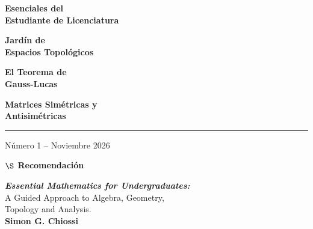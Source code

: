 \documentclass[8pt]{extarticle}
\begin{document}
\begin{center}
\begin{center}

\end{center}


\vspace{0.4cm}

\noindent
    {\selectfont\footnotesize\bfseries
\parbox[c]{1.7cm}{\centering\textbf{Esenciales del \\ Estudiante de Licenciatura}}%
\hfill
\parbox[c]{1.7cm}{\centering\textbf{Jardín de \\Espacios Topológicos}}%
\hfill
\parbox[c]{1.7cm}{\centering\textbf{El Teorema de \\Gauss-Lucas}}%
\hfill
\parbox[c]{1.7cm}{\centering\textbf{Matrices Simétricas y\\  Antisimétricas}}%
}
    \vspace{0.2cm}
    \hrule
    \vspace{0.2cm}
    {\footnotesize Número 1 -- Noviembre 2026}
\end{center}
\vspace{0.5cm}


\newpage

\begin{center}
    {\large \textbf{ $\S$ Recomendación}} {$~~$\small\faCoffee}
\end{center}

\vspace{0.14cm}

\begin{center}
    {\large\textit{\textbf{Essential Mathematics for Undergraduates:}}\\ \vspace{0.3cm}
    {\small A Guided Approach to Algebra, Geometry,\\ Topology and Analysis.}}\\
    \vspace{0.3cm}
    {\small \textbf{Simon G. Chiossi}}
    
\end{center}

\vspace{0.14cm}
\end{document}
